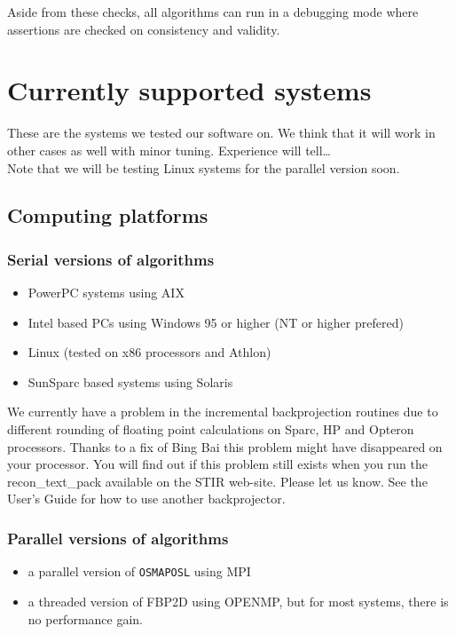 \documentclass{article}
\begin{document}
Aside from these checks, all algorithms can run in a debugging 
mode where assertions are checked on consistency and validity.



\section{
Currently supported systems}

These are the systems we tested our software on. We think that 
it will work in other cases as well with minor tuning. Experience 
will tell\dots \\
Note that we will be testing Linux systems for the parallel version 
soon.



\subsection{
Computing platforms}


\subsubsection{
Serial versions of algorithms}
\begin{itemize}
\item 
PowerPC systems using AIX 
\item 
Intel based PCs using Windows 95 or higher (NT or higher prefered) 
\item 
Linux (tested on x86 processors and Athlon)
\item 
SunSparc based systems using Solaris 
\end{itemize}
We currently have a problem 
in the incremental backprojection routines due to different rounding 
of floating point calculations on Sparc, HP and Opteron processors. 
Thanks to a fix of Bing Bai this problem might have disappeared on your processor.
You will find out if this problem still exists when you run the 
recon\_text\_pack available on the STIR web-site. Please let us know.
See the User's Guide for how to use another backprojector.


\subsubsection{
Parallel versions of algorithms}
\begin{itemize}
\item a parallel version of \texttt{OSMAPOSL} using MPI 
\item a threaded version of FBP2D using OPENMP, but for most systems, there is no performance gain.
\end{itemize}
\end{document}
